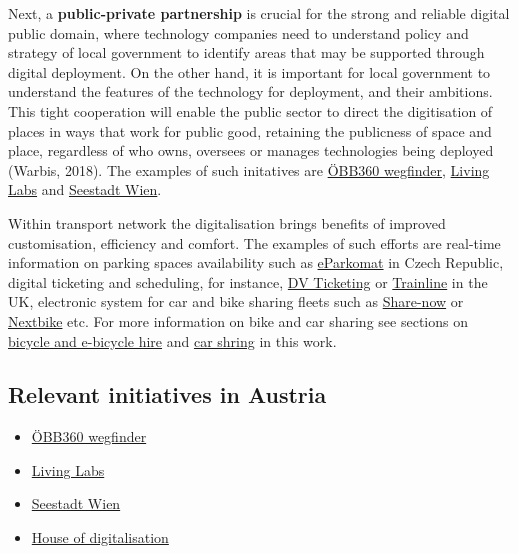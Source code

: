 \documentclass[
]{book}
\providecommand{\tightlist}{%
  \setlength{\itemsep}{0pt}\setlength{\parskip}{0pt}}
\begin{document}
Next, a \textbf{public-private partnership} is crucial for the strong and reliable digital public domain, where technology companies need to understand policy and strategy of local government to identify areas that may be supported through digital deployment. On the other hand, it is important for local government to understand the features of the technology for deployment, and their ambitions. This tight cooperation will enable the public sector to direct the digitisation of places in ways that work for public good, retaining the publicness of space and place, regardless of who owns, oversees or manages technologies being deployed (Warbis, 2018). The examples of such initatives are \href{https://wegfinder.at/presse/2021/mit-wegfinder-ist-mobility-as-a-service-in-oesterreich-angekommen(1)/}{ÖBB360 wegfinder}, \href{https://austriatech.at/en/insight-into-the-work-of-the-urban-mobility-laboratories/}{Living Labs} and \href{https://www.aspern-seestadt.at/en}{Seestadt Wien}.

Within transport network the digitalisation brings benefits of improved customisation, efficiency and comfort. The examples of such efforts are real-time information on parking spaces availability such as \href{https://www.eparkomat.com/}{eParkomat} in Czech Republic, digital ticketing and scheduling, for instance, \href{https://www.dv-ticketing.com/}{DV Ticketing} or \href{https://www.thetrainline.com/}{Trainline} in the UK, electronic system for car and bike sharing fleets such as \href{https://www.share-now.com/at/en/}{Share-now} or \href{https://www.nextbike.at/de/niederoesterreich/}{Nextbike} etc. For more information on bike and car sharing see sections on \protect\hyperlink{bike_sharing}{bicycle and e-bicycle hire} and \protect\hyperlink{car_sharing}{car shring} in this work.

\hypertarget{relevant-initiatives-in-austria-3}{%
\subsection*{Relevant initiatives in Austria}\label{relevant-initiatives-in-austria-3}}

\begin{itemize}
\tightlist
\item
  \href{https://wegfinder.at/presse/2021/mit-wegfinder-ist-mobility-as-a-service-in-oesterreich-angekommen(1)/}{ÖBB360 wegfinder}
\item
  \href{https://austriatech.at/en/insight-into-the-work-of-the-urban-mobility-laboratories/}{Living Labs}
\item
  \href{https://www.aspern-seestadt.at/en}{Seestadt Wien}
\item
  \href{https://ec.europa.eu/regional_policy/en/projects/Austria/support-for-digital-transformation-in-lower-austria}{House of digitalisation}
\end{itemize}
\end{document}
